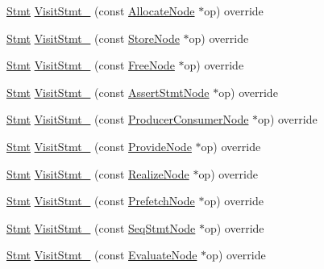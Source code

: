 \begin{DoxyCompactItemize}
\item 
\hyperlink{classtvm_1_1tir_1_1Stmt}{Stmt} \hyperlink{classtvm_1_1tir_1_1StmtMutator_ab094e88d4bda5882756d136c15db6260}{Visit\+Stmt\+\_\+} (const \hyperlink{classtvm_1_1tir_1_1AllocateNode}{Allocate\+Node} $\ast$op) override
\item 
\hyperlink{classtvm_1_1tir_1_1Stmt}{Stmt} \hyperlink{classtvm_1_1tir_1_1StmtMutator_a3b116212aaf79bc898f3446a35f7fd3e}{Visit\+Stmt\+\_\+} (const \hyperlink{classtvm_1_1tir_1_1StoreNode}{Store\+Node} $\ast$op) override
\item 
\hyperlink{classtvm_1_1tir_1_1Stmt}{Stmt} \hyperlink{classtvm_1_1tir_1_1StmtMutator_a0cb470550bb15df90ced3e95961ad3d7}{Visit\+Stmt\+\_\+} (const \hyperlink{classtvm_1_1tir_1_1FreeNode}{Free\+Node} $\ast$op) override
\item 
\hyperlink{classtvm_1_1tir_1_1Stmt}{Stmt} \hyperlink{classtvm_1_1tir_1_1StmtMutator_aa3a94c8b418881f10d855592b847c2e7}{Visit\+Stmt\+\_\+} (const \hyperlink{classtvm_1_1tir_1_1AssertStmtNode}{Assert\+Stmt\+Node} $\ast$op) override
\item 
\hyperlink{classtvm_1_1tir_1_1Stmt}{Stmt} \hyperlink{classtvm_1_1tir_1_1StmtMutator_a4474981a7a3ff050b0013e7249a99a04}{Visit\+Stmt\+\_\+} (const \hyperlink{classtvm_1_1tir_1_1ProducerConsumerNode}{Producer\+Consumer\+Node} $\ast$op) override
\item 
\hyperlink{classtvm_1_1tir_1_1Stmt}{Stmt} \hyperlink{classtvm_1_1tir_1_1StmtMutator_abcdd396a82232cb6a1e2031f28be380e}{Visit\+Stmt\+\_\+} (const \hyperlink{classtvm_1_1tir_1_1ProvideNode}{Provide\+Node} $\ast$op) override
\item 
\hyperlink{classtvm_1_1tir_1_1Stmt}{Stmt} \hyperlink{classtvm_1_1tir_1_1StmtMutator_a83bc8d9f6cb1137ee1de48164329969c}{Visit\+Stmt\+\_\+} (const \hyperlink{classtvm_1_1tir_1_1RealizeNode}{Realize\+Node} $\ast$op) override
\item 
\hyperlink{classtvm_1_1tir_1_1Stmt}{Stmt} \hyperlink{classtvm_1_1tir_1_1StmtMutator_aecd16bf1a6715ea36f6c30e5dc2ceae7}{Visit\+Stmt\+\_\+} (const \hyperlink{classtvm_1_1tir_1_1PrefetchNode}{Prefetch\+Node} $\ast$op) override
\item 
\hyperlink{classtvm_1_1tir_1_1Stmt}{Stmt} \hyperlink{classtvm_1_1tir_1_1StmtMutator_a60b18d6d6bfcb692ab4a369465a175a3}{Visit\+Stmt\+\_\+} (const \hyperlink{classtvm_1_1tir_1_1SeqStmtNode}{Seq\+Stmt\+Node} $\ast$op) override
\item 
\hyperlink{classtvm_1_1tir_1_1Stmt}{Stmt} \hyperlink{classtvm_1_1tir_1_1StmtMutator_a2ec423a8f109916abf02ac463308f58a}{Visit\+Stmt\+\_\+} (const \hyperlink{classtvm_1_1tir_1_1EvaluateNode}{Evaluate\+Node} $\ast$op) override

\end{DoxyCompactItemize}
